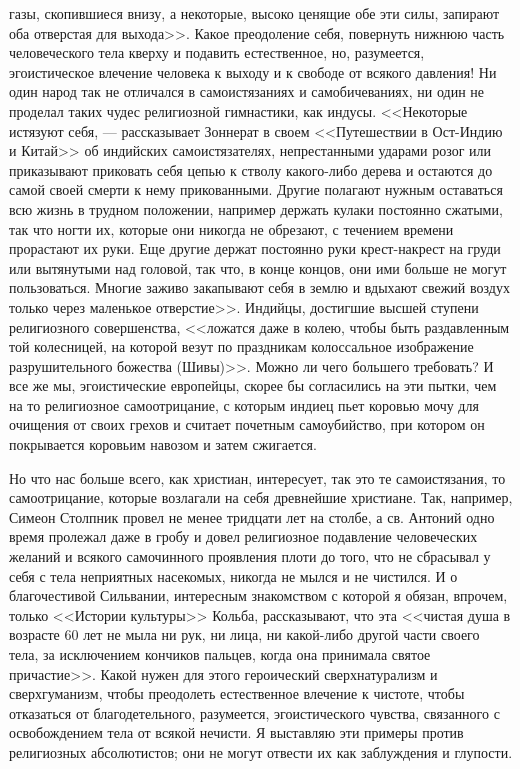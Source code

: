 \documentclass[12pt]{article}
\begin{document}
газы, скопившиеся внизу, а некоторые, высоко ценящие обе эти силы, запирают оба отверстая для выхода>>. Какое преодоление себя, повернуть нижнюю часть человеческого тела кверху и подавить естественное, но, разумеется, эгоистическое влечение человека к выходу и к свободе от всякого давления! Ни один народ так не отличался в самоистязаниях и самобичеваниях, ни один не проделал таких чудес религиозной гимнастики, как индусы. <<Некоторые истязуют себя, --- рассказывает Зоннерат в своем <<Путешествии в Ост-Индию и Китай>> об индийских самоистязателях, непрестанными ударами розог или приказывают приковать себя цепью к стволу какого-либо дерева и остаются до самой своей смерти к нему прикованными. Другие полагают нужным оставаться всю жизнь в трудном положении, например держать кулаки постоянно сжатыми, так что ногти их, которые они никогда не обрезают, с течением времени прорастают их руки. Еще другие держат постоянно руки крест-накрест на груди или вытянутыми над головой, так что, в конце концов, они ими больше не могут пользоваться. Многие заживо закапывают себя в землю и вдыхают свежий воздух только через маленькое отверстие>>. Индийцы, достигшие высшей ступени религиозного совершенства, <<ложатся даже в колею, чтобы быть раздавленным той колесницей, на которой везут по праздникам колоссальное изображение разрушительного божества (Шивы)>>. Можно ли чего большего требовать? И все же мы, эгоистические европейцы, скорее бы согласились на эти пытки, чем на то религиозное самоотрицание, с которым индиец пьет коровью мочу для очищения от своих грехов и считает почетным самоубийство, при котором он покрывается коровьим навозом и затем сжигается. 

Но что нас больше всего, как христиан, интересует, так это те самоистязания, то самоотрицание, которые возлагали на себя древнейшие христиане. Так, например, Симеон Столпник провел не менее тридцати лет на столбе, а св. Антоний одно время пролежал даже в гробу и довел религиозное подавление человеческих желаний и всякого самочинного проявления плоти до того, что не сбрасывал у себя с тела неприятных насекомых, никогда не мылся и не чистился. И о благочестивой Сильвании, интересным знакомством с которой я обязан, впрочем, только <<Истории культуры>> Кольба, рассказывают, что эта <<чистая душа в возрасте 60 лет не мыла ни рук, ни лица, ни какой-либо другой части своего тела, за исключением кончиков пальцев, когда она принимала святое причастие>>. Какой нужен для этого героический сверхнатурализм и сверхгуманизм, чтобы преодолеть естественное влечение к чистоте, чтобы отказаться от благодетельного, разумеется, эгоистического чувства, связанного с освобождением тела от всякой нечисти. Я выставляю эти примеры против религиозных абсолютистов; они не могут отвести их как заблуждения и глупости. 
\end{document}
